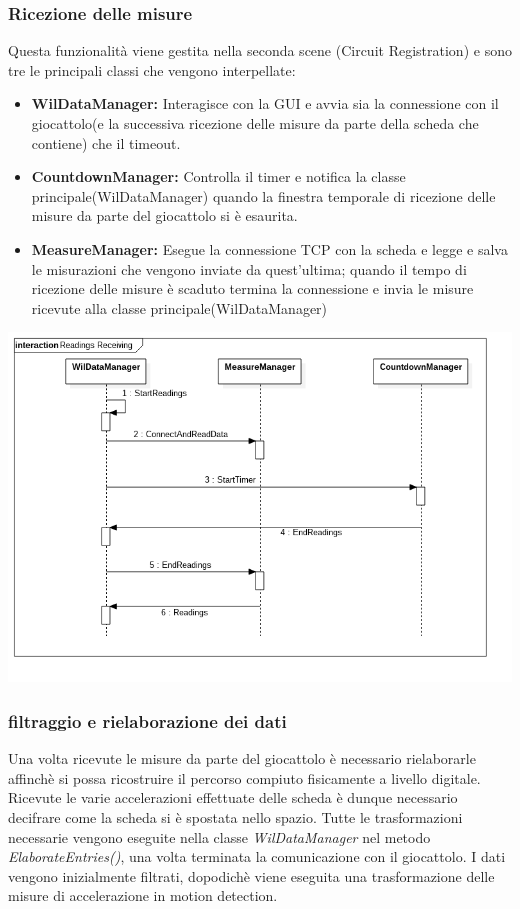 \documentclass[documentation.tex]{subfiles}
\begin{document}
	\subsubsection{Ricezione delle misure}
		Questa funzionalità viene gestita nella seconda scene (Circuit Registration) e sono tre le principali classi che vengono interpellate:
		\begin{itemize}
			\item \textbf{WilDataManager:} Interagisce con la GUI e avvia sia la connessione con il giocattolo(e la successiva ricezione delle misure da parte della scheda che contiene) che il timeout.
			\item \textbf{CountdownManager:} Controlla il timer e notifica la classe principale(WilDataManager) quando la finestra temporale di ricezione delle misure da parte del giocattolo si è esaurita.
			\item \textbf{MeasureManager: } Esegue la connessione TCP con la scheda e legge e salva le misurazioni che vengono inviate da quest'ultima; quando il tempo di ricezione delle misure è scaduto termina la connessione e invia le misure ricevute alla classe principale(WilDataManager)
		\end{itemize}
		\includegraphics[width=\textwidth]{./diagrams/measure_receiving.png}
	\subsubsection{filtraggio e rielaborazione dei dati}
		Una volta ricevute le misure da parte del giocattolo è necessario rielaborarle affinchè si possa ricostruire il percorso compiuto fisicamente a livello digitale. Ricevute le varie accelerazioni effettuate delle scheda è dunque necessario decifrare come la scheda si è spostata nello spazio. Tutte le trasformazioni necessarie vengono eseguite nella classe \textit{WilDataManager} nel metodo \textit{ElaborateEntries()}, una volta terminata la comunicazione con il giocattolo. I dati vengono inizialmente filtrati, dopodichè viene eseguita una trasformazione delle misure di accelerazione in motion detection.
\end{document}
